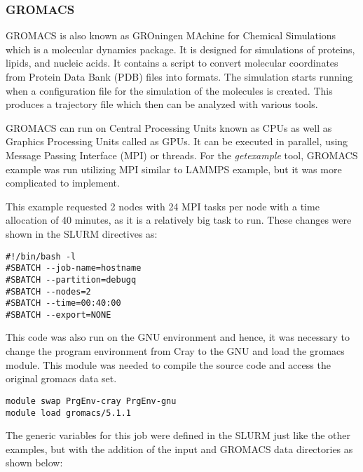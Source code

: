 \subsubsection{GROMACS}

GROMACS is also known as GROningen MAchine for Chemical Simulations which is a molecular dynamics package. It is designed for simulations of proteins, 
lipids, and nucleic acids. It contains a script to convert molecular coordinates from Protein Data Bank (PDB) files into formats. The simulation starts 
running when a configuration file for the simulation of the molecules is created. This produces a trajectory file which then can be analyzed with various 
tools.

GROMACS can run on Central Processing Units known as CPUs as well as Graphics Processing Units called as GPUs. It can be executed in parallel, using 
Message Passing Interface (MPI) or threads. For the \emph{getexample} tool, GROMACS example was run utilizing MPI similar to LAMMPS example, but it was 
more complicated to implement.

This example requested 2 nodes with 24 MPI tasks per node with a time allocation of 40 minutes, as it is a relatively big task to run. These changes
were shown in the SLURM directives as:

\begin{tcolorbox}
\begin{Verbatim}[fontsize=\scriptsize]
#!/bin/bash -l
#SBATCH --job-name=hostname
#SBATCH --partition=debugq
#SBATCH --nodes=2
#SBATCH --time=00:40:00
#SBATCH --export=NONE
\end{Verbatim}
\end{tcolorbox}

This code was also run on the GNU environment and hence, it was necessary to change the program environment from Cray to the GNU and load the gromacs
module. This module was needed to compile the source code and access the original gromacs data set.

\begin{tcolorbox}
\begin{Verbatim}[fontsize=\scriptsize]
module swap PrgEnv-cray PrgEnv-gnu
module load gromacs/5.1.1
\end{Verbatim}
\end{tcolorbox}

The generic variables for this job were defined in the SLURM just like the other examples, but with the addition of the input and GROMACS data 
directories as shown below:

